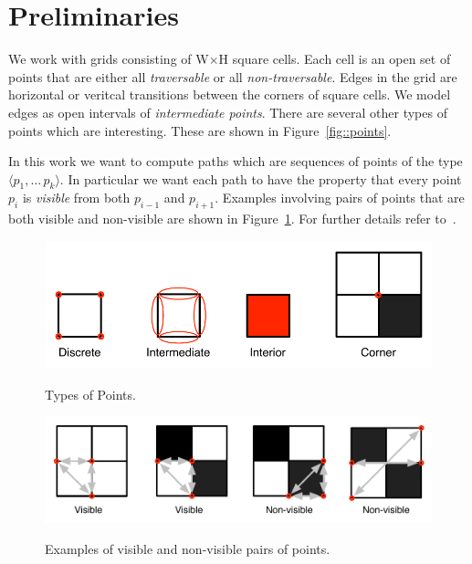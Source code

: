 \section{Preliminaries}
\label{sec::preliminaries}

We work with grids consisting of W$\times$H square cells.  Each cell is an
open set of points that are either all \emph{traversable} or all
\emph{non-traversable}.  Edges in the grid are horizontal or veritcal
transitions between the corners of square cells. We model edges as open
intervals of \emph{intermediate points}.  There are several other types of
points which are interesting. These are shown in Figure~\ref{fig::points}.

%

In this work we want to compute paths which are sequences of points of the
type $\langle p_1, \ldots\, p_k\rangle$. In particular we want each path to
have the property that every point $p_i$ is \emph{visible} from both $p_{i-1}$
and $p_{i+1}$.  Examples involving pairs of points that are both visible and
non-visible  are shown in Figure~\ref{fig::visibility}.
For further details refer to~\cite{haraborG13}.

\begin{figure}[hb]
\begin{minipage}[tb]{0.95\columnwidth}
\center
		   \includegraphics[width=0.45\columnwidth]
			{images/types_of_points.pdf}
	\vspace{-3pt}
       \label{fig::points}
       \caption{Types of Points.}
\end{minipage}
\begin{minipage}[tb]{0.95\columnwidth}
\center
		   \includegraphics[width=0.55\columnwidth]
			{images/visibility.pdf}
	\vspace{-3pt}
       \label{fig::visibility}
       \caption{Examples of visible and non-visible pairs of points.}
\end{minipage}
\end{figure}
